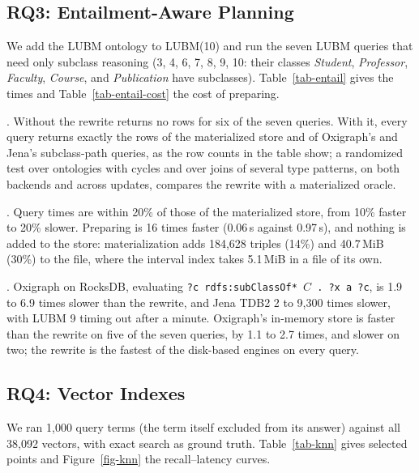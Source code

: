

\subsection{RQ3: Entailment-Aware Planning}

We add the LUBM ontology to LUBM(10) and run the seven LUBM queries that need
only subclass reasoning (3, 4, 6, 7, 8, 9, 10: their classes \emph{Student},
\emph{Professor}, \emph{Faculty}, \emph{Course}, and \emph{Publication} have
subclasses).
Table~\ref{tab-entail} gives the times and Table~\ref{tab-entail-cost} the cost
of preparing.





.
Without the rewrite \sys returns no rows for six of the seven queries.
With it, every query returns exactly the rows of the materialized store and of
Oxigraph's and Jena's subclass-path queries, as the row counts in the table
show; a randomized test over ontologies with cycles and over joins of several
type patterns, on both backends and across updates, compares the rewrite with a
materialized oracle.

.
Query times are within 20\% of those of the materialized store, from 10\%
faster to 20\% slower.
Preparing is 16 times faster (0.06\,s against 0.97\,s), and nothing is added to
the store: materialization adds 184,628 triples (14\%) and 40.7\,MiB (30\%) to
the file, where the interval index takes 5.1\,MiB in a file of its own.

.
Oxigraph on RocksDB, evaluating \texttt{?c rdfs:subClassOf* $C$ . ?x a ?c}, is
1.9 to 6.9 times slower than the rewrite, and Jena TDB2 2 to 9,300 times
slower, with LUBM 9 timing out after a minute.
Oxigraph's in-memory store is faster than the rewrite on five of the seven
queries, by 1.1 to 2.7 times, and slower on two; the rewrite is the fastest of
the disk-based engines on every query.

\subsection{RQ4: Vector Indexes}

We ran 1,000 query terms (the term itself excluded from its answer) against
all 38,092 vectors, with exact search as ground truth.
Table~\ref{tab-knn} gives selected points and Figure~\ref{fig-knn} the
recall--latency curves.

